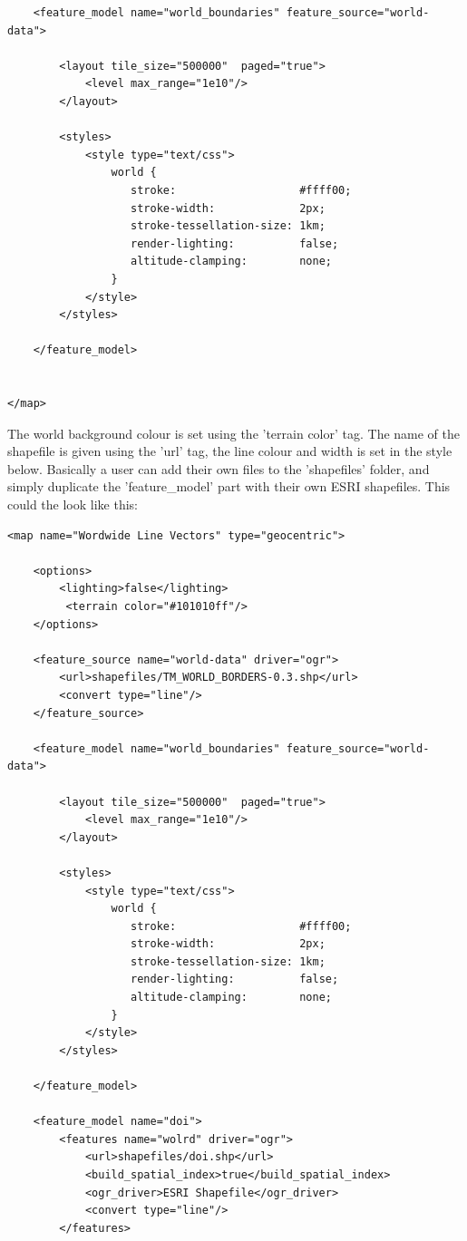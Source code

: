 {\begin{verbatim}
    <feature_model name="world_boundaries" feature_source="world-data">
        
        <layout tile_size="500000"  paged="true">
            <level max_range="1e10"/>
        </layout>
                
        <styles>
            <style type="text/css">
                world {
                   stroke:                   #ffff00;
                   stroke-width:             2px;
                   stroke-tessellation-size: 1km;
                   render-lighting:          false;
                   altitude-clamping:        none;
                }            
            </style>
        </styles>
        
    </feature_model>
 

</map>
\end{verbatim}

The world background colour is set using the 'terrain color' tag. The name of the shapefile is given using the 'url' tag, the line colour and width is set in the style below. Basically a user can add their own files to the 'shapefiles' folder, and simply duplicate the 'feature\_model' part with their own ESRI shapefiles. This could the look like this:

\begin{verbatim}
<map name="Wordwide Line Vectors" type="geocentric">
  
    <options>
        <lighting>false</lighting>
         <terrain color="#101010ff"/>
    </options>

    <feature_source name="world-data" driver="ogr">
        <url>shapefiles/TM_WORLD_BORDERS-0.3.shp</url>
        <convert type="line"/>
    </feature_source>
    
    <feature_model name="world_boundaries" feature_source="world-data">
        
        <layout tile_size="500000"  paged="true">
            <level max_range="1e10"/>
        </layout>
                
        <styles>
            <style type="text/css">
                world {
                   stroke:                   #ffff00;
                   stroke-width:             2px;
                   stroke-tessellation-size: 1km;
                   render-lighting:          false;
                   altitude-clamping:        none;
                }            
            </style>
        </styles>
        
    </feature_model>
  
    <feature_model name="doi">
        <features name="wolrd" driver="ogr">
            <url>shapefiles/doi.shp</url>
            <build_spatial_index>true</build_spatial_index>
            <ogr_driver>ESRI Shapefile</ogr_driver>
            <convert type="line"/>
        </features>        


\end{verbatim}}
